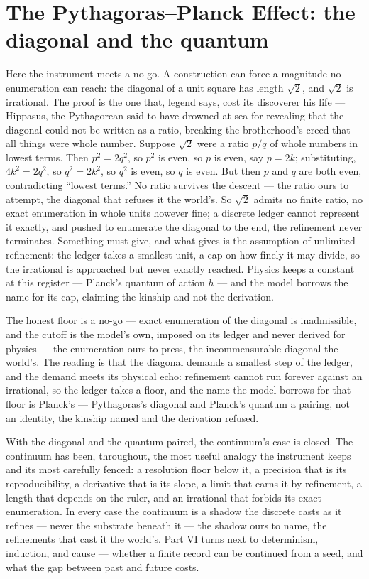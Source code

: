 \section{The Pythagoras--Planck Effect: the diagonal and the quantum}
\label{se:pythagoras-planck}

Here the instrument meets a no-go. A construction can force a magnitude no enumeration can reach: the diagonal
of a unit square has length $\sqrt 2$, and $\sqrt 2$ is irrational. The proof is the one that, legend says, cost its
discoverer his life --- Hippasus, the Pythagorean said to have drowned at sea for revealing that the diagonal
could not be written as a ratio, breaking the brotherhood's creed that all things were whole number. Suppose
$\sqrt 2$ were a ratio $p/q$ of whole numbers in lowest terms. Then
$p^2 = 2q^2$, so $p^2$ is even, so $p$ is even, say $p = 2k$; substituting, $4k^2 = 2q^2$, so $q^2 = 2k^2$, so
$q^2$ is even, so $q$ is even. But then $p$ and $q$ are both even, contradicting ``lowest terms.'' No ratio
survives the descent --- the ratio ours to attempt, the diagonal that refuses it the world's. So $\sqrt 2$
admits no finite ratio, no exact enumeration in whole units however fine; a
discrete ledger cannot represent it exactly, and pushed to enumerate the diagonal to the end, the refinement
never terminates. Something must give, and what gives is the assumption of unlimited refinement: the ledger
takes a smallest unit, a cap on how finely it may divide, so the irrational is approached but never exactly
reached. Physics keeps a constant at this register --- Planck's quantum of action $h$ --- and the model
borrows the name for its cap, claiming the kinship and not the derivation.

The honest floor is a no-go --- exact enumeration of the diagonal is inadmissible, and the cutoff is the
model's own, imposed on its ledger and never derived for physics --- the enumeration ours to press, the
incommensurable diagonal the world's. The reading is that the diagonal demands a smallest step of the ledger,
and the demand meets its physical echo: refinement cannot run forever against an irrational, so the ledger
takes a floor, and the name the model borrows for that floor is Planck's --- Pythagoras's diagonal and Planck's
quantum a pairing, not an identity, the kinship named and the derivation refused.

\bigskip

With the diagonal and the quantum paired, the continuum's case is closed. The continuum has been, throughout,
the most useful analogy the instrument keeps and its most carefully fenced: a resolution floor below it, a
precision that is its reproducibility, a
derivative that is its slope, a limit that earns it by refinement, a length that depends on the ruler, and an
irrational that forbids its exact enumeration. In every case the continuum is a shadow the discrete casts as it
refines --- never the substrate beneath it --- the shadow ours to name, the refinements that cast it the
world's. Part VI turns next to determinism, induction, and cause --- whether
a finite record can be continued from a seed, and what the gap between past and future costs.

